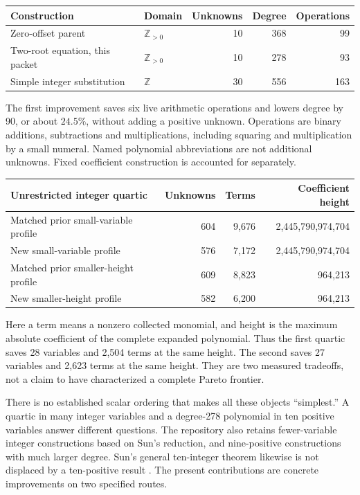 \documentclass[11pt]{article}
\theoremstyle{remark}\newtheorem{remark}[theorem]{Remark}
\newcommand{\Z}{\mathbb Z}
\newcommand{\Zp}{\mathbb Z_{>0}}
\begin{document}
\begin{center}\small
\begin{tabular}{@{}llrrr@{}}
\toprule
Construction & Domain & Unknowns & Degree & Operations\\
\midrule
Zero-offset parent & $\Zp$ & 10 & 368 & 99\\
Two-root equation, this packet & $\Zp$ & 10 & 278 & 93\\
Simple integer substitution & $\Z$ & 30 & 556 & 163\\
\bottomrule
\end{tabular}
\end{center}

The first improvement saves six live arithmetic operations and lowers degree
by 90, or about $24.5\%$, without adding a positive unknown. Operations are
binary additions, subtractions and multiplications, including squaring and
multiplication by a small numeral. Named polynomial abbreviations are not
additional unknowns. Fixed coefficient construction is accounted for
separately.

\begin{center}\small
\begin{tabular}{@{}lrrr@{}}
\toprule
Unrestricted integer quartic & Unknowns & Terms & Coefficient height\\
\midrule
Matched prior small-variable profile & 604 & 9,676 & 2,445,790,974,704\\
New small-variable profile & 576 & 7,172 & 2,445,790,974,704\\
Matched prior smaller-height profile & 609 & 8,823 & 964,213\\
New smaller-height profile & 582 & 6,200 & 964,213\\
\bottomrule
\end{tabular}
\end{center}

Here a term means a nonzero collected monomial, and height is the maximum
absolute coefficient of the complete expanded polynomial. Thus the first
quartic saves 28 variables and 2,504 terms at the same height. The second saves
27 variables and 2,623 terms at the same height. They are two measured
tradeoffs, not a claim to have characterized a complete Pareto frontier.

There is no established scalar ordering that makes all these objects
``simplest.'' A quartic in many integer variables and a degree-278 polynomial
in ten positive variables answer different questions. The repository also
retains fewer-variable integer constructions based on Sun's reduction, and
nine-positive constructions with much larger degree. Sun's general
ten-integer theorem likewise is not displaced by a ten-positive result
\cite{sun2026}. The present contributions are concrete improvements on two
specified routes.
\end{document}
